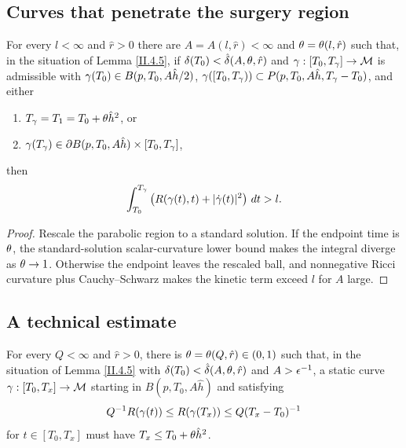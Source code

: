 \subsection{Curves that penetrate the surgery region}
\label{II.4.6}

\begin{corollary}
  \label{cor:kl-curves-that-penetrate-surgery-region-ricci-flow-surgery-corollary}
\label{corollaryII.4.6}
For every $l<\infty$ and $\hat r>0$ there are $A=A(l,\hat r)<\infty$ and
$\theta=\theta(l,\hat r)$ such that, in the situation of Lemma \ref{II.4.5},
if $\delta(T_0)<\hat\delta(A,\theta,\hat r)$ and
$\gamma:[T_0,T_\gamma]\rightarrow{\mathcal M}$ is admissible with
$\gamma(T_0)\in B(p,T_0,A\hat h/2)$,
$\gamma([T_0,T_\gamma))\subset P(p,T_0,A\hat h,T_\gamma-T_0)$, and either
\begin{enumerate}
\item $T_\gamma=T_1=T_0+\theta\hat h^2$, or
\item $\gamma(T_\gamma)\in\partial B(p,T_0,A\hat h)\times[T_0,T_\gamma]$,
\end{enumerate}
then
\begin{equation}
\int_{T_0}^{T_\gamma}\left(R(\gamma(t),t)+|\dot{\gamma}(t)|^2\right)\,dt>l.
\end{equation}
\end{corollary}
\begin{proof}
\sketch Rescale the parabolic region to a standard solution. If the endpoint
time is $\theta$, the standard-solution scalar-curvature lower bound makes the
integral diverge as $\theta\rightarrow1$. Otherwise the endpoint leaves the rescaled
ball, and nonnegative Ricci curvature plus Cauchy--Schwarz makes the kinetic
term exceed $l$ for $A$ large.
\end{proof}

\subsection{A technical estimate}

\begin{corollary}
  \label{cor:kl-technical-estimate-existence-technical-estimate}
For every $Q<\infty$ and $\hat r>0$, there is
$\theta=\theta(Q,\hat r)\in(0,1)$ such that, in the situation of Lemma
\ref{II.4.5} with $\delta(T_0)<\hat\delta(A,\theta,\hat r)$ and
$A>\epsilon^{-1}$, a static curve $\gamma:[T_0,T_x]\rightarrow{\mathcal M}$ starting in
$B(p,T_0,A\hat h)$ and satisfying
\begin{equation}
\label{Rbound}
Q^{-1}R(\gamma(t))\leq R(\gamma(T_x))\leq Q(T_x-T_0)^{-1}
\end{equation}
for $t\in[T_0,T_x]$ must have $T_x\leq T_0+\theta\hat h^2$.
\end{corollary}

